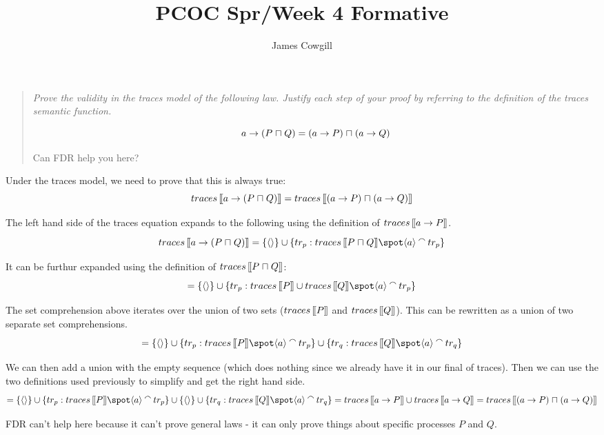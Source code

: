 \documentclass[a4paper,12pt,DIV=calc]{scrartcl}
\begin{document}
\title{PCOC Spr/Week 4 Formative}
\author{James Cowgill}
\maketitle

\begin{quote}
\itshape
Prove the validity in the traces model of the following law. Justify each step
of your proof by referring to the definition of the traces semantic function.

\[a \then (P \intchoice Q) = (a \then P) \intchoice (a \then Q)\]

Can FDR help you here?
\end{quote}

Under the traces model, we need to prove that this is always true:
\[
\Traces[a \then (P \intchoice Q)] =
\Traces[(a \then P) \intchoice (a \then Q)]
\]

The left hand side of the traces equation expands to the following using the
definition of $\Traces[a \then P]$.
\[
\Traces[a \then (P \intchoice Q)] \\ 
= \set{\nil} \union
\set{tr_p : \Traces[P \intchoice Q] \spot \trace{a} \cat tr_p}
\]

It can be furthur expanded using the definition of $\Traces[P \intchoice Q]$:
\[
= \set{\nil} \union
\set{tr_p : \Traces[P] \union \Traces[Q] \spot \trace{a} \cat tr_p}
\]

The set comprehension above iterates over the union of two sets ($\Traces[P]$
and $\Traces[Q]$). This can be rewritten as a union of two separate set
comprehensions.
\[
= \set{\nil} \union
\set{tr_p : \Traces[P] \spot \trace{a} \cat tr_p} \union
\set{tr_q : \Traces[Q] \spot \trace{a} \cat tr_q}
\]

We can then add a union with the empty sequence (which does nothing since we
already have it in our final of traces). Then we can use the two definitions
used previously to simplify and get the right hand side.
\[
= \set{\nil} \union
\set{tr_p : \Traces[P] \spot \trace{a} \cat tr_p} \union
\set{\nil} \union
\set{tr_q : \Traces[Q] \spot \trace{a} \cat tr_q} \\
= \Traces[a \then P] \union \Traces[a \then Q] \\
= \Traces[(a \then P) \intchoice (a \then Q)]
\]

FDR can't help here because it can't prove general laws - it can only prove
things about specific processes $P$ and $Q$.
\end{document}
